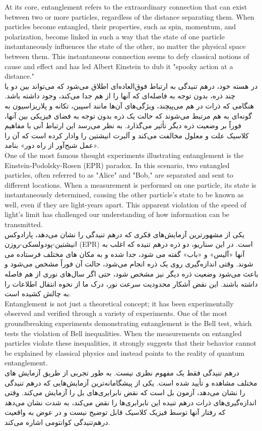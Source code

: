 \documentclass{book}
\begin{document}
At its core, entanglement refers to the extraordinary connection that can exist between two or more particles, regardless of the distance separating them. When particles become entangled, their properties, such as spin, momentum, and polarization, become linked in such a way that the state of one particle instantaneously influences the state of the other, no matter the physical space between them. This instantaneous connection seems to defy classical notions of cause and effect and has led Albert Einstein to dub it "spooky action at a distance."\\
در هسته خود، درهم تنیدگی به ارتباط فوق‌العاده‌ای اطلاق می‌شود که می‌تواند بین دو یا چند ذره، بدون توجه به فاصله‌ای که آنها را از هم جدا می‌کند، وجود داشته باشد. هنگامی که ذرات در هم می‌پیچند، ویژگی‌های آن‌ها مانند اسپین، تکانه و پلاریزاسیون به گونه‌ای به هم مرتبط می‌شوند که حالت یک ذره بدون توجه به فضای فیزیکی بین آنها، فوراً بر وضعیت ذره دیگر تأثیر می‌گذارد. به نظر می‌رسد این ارتباط آنی با مفاهیم کلاسیک علت و معلول مخالفت می‌کند و آلبرت انیشتین را وادار کرده است که آن را «عمل شبح‌آور از راه دور» بنامد.\\

One of the most famous thought experiments illustrating entanglement is the Einstein-Podolsky-Rosen (EPR) paradox. In this scenario, two entangled particles, often referred to as "Alice" and "Bob," are separated and sent to different locations. When a measurement is performed on one particle, its state is instantaneously determined, causing the other particle's state to be known as well, even if they are light-years apart. This apparent violation of the speed of light's limit has challenged our understanding of how information can be transmitted.\\
یکی از مشهورترین آزمایش‌های فکری که درهم تنیدگی را نشان می‌دهد، پارادوکس انیشتین-پودولسکی-روزن (EPR) است. در این سناریو، دو ذره درهم تنیده که اغلب به آنها «آلیس» و «باب» گفته می شود، جدا شده و به مکان های مختلف فرستاده می شوند. وقتی اندازه‌گیری روی یک ذره انجام می‌شود، حالت آن فوراً مشخص می‌شود و باعث می‌شود وضعیت ذره دیگر نیز مشخص شود، حتی اگر سال‌های نوری از هم فاصله داشته باشند. این نقض آشکار محدودیت سرعت نور، درک ما از نحوه انتقال اطلاعات را به چالش کشیده است.\\

Entanglement is not just a theoretical concept; it has been experimentally observed and verified through a variety of experiments. One of the most groundbreaking experiments demonstrating entanglement is the Bell test, which tests the violation of Bell inequalities. When the measurements on entangled particles violate these inequalities, it strongly suggests that their behavior cannot be explained by classical physics and instead points to the reality of quantum entanglement.\\
درهم تنیدگی فقط یک مفهوم نظری نیست. به طور تجربی از طریق آزمایش های مختلف مشاهده و تأیید شده است. یکی از پیشگامانه‌ترین آزمایش‌هایی که درهم تنیدگی را نشان می‌دهد، آزمون بل است که نقض نابرابری‌های بل را آزمایش می‌کند. وقتی اندازه‌گیری‌های ذرات درهم تنیده این نابرابری‌ها را نقض می‌کند، به شدت نشان می‌دهد که رفتار آنها توسط فیزیک کلاسیک قابل توضیح نیست و در عوض به واقعیت درهم‌تنیدگی کوانتومی اشاره می‌کند.\\
\end{document}
